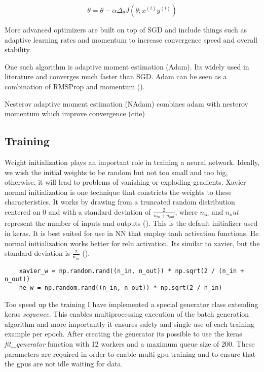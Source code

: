 \begin{equation}
    \theta = \theta - \alpha \Delta_{\theta} J(\theta ;x^{(i)}y^{(i)})
\end{equation}

More advanced optimizers are built on top of SGD and include things such as adaptive learning rates and momentum to increase convergence speed and overall stability.

One such algorithm is adaptive moment estimation (Adam). Its widely used in literature and converges much faster than SGD. Adam can be seen as a combination of RMSProp and momentum (\citet{Adam}).

Nesterov adaptive moment estimation (NAdam) combines adam with nesterov momentum which improve convergence (cite)

\subsection{Training}
Weight initialization plays an important role in training a neural network. Ideally, we wish the initial weights to be random but not too small and too big, otherwise, it will lead to problems of vanishing or exploding gradients. Xavier normal initialization is one technique that constricts the weights to these characteristics. It works by drawing from a truncated random distribution centered on 0 and with a standard deviation of \(\frac{2}{n_{in} + n_{out}}\), where \(n_{in}\) and \(n_out\) represent the number of inputs and outputs (\citet{initialization}). This is the default initializer used in keras. It is best suited for use in NN that employ tanh activation functions. He normal initialization works better for relu activation. Its similar to xavier, but the standard deviation is \(\frac{2}{n_{in}}\) (\citet{rectifiers}).

\begin{verbatim}
    xavier_w = np.random.rand((n_in, n_out)) * np.sqrt(2 / (n_in + n_out))
    he_w = np.random.rand((n_in, n_out)) * np.sqrt(2 / n_in)
\end{verbatim}

Too speed up the training I have implemented a special generator class extending keras \emph{sequence}. This enables multiprocessing execution of the batch generation algorithm and more importantly it ensures safety and single use of each training example per epoch.
After creating the generator its possible to use the keras \emph{fit\_generator} function with 12 workers and a maximum queue size of 200. These parameters are required in order to enable multi-gpu training and to ensure that the gpus are not idle waiting for data.

